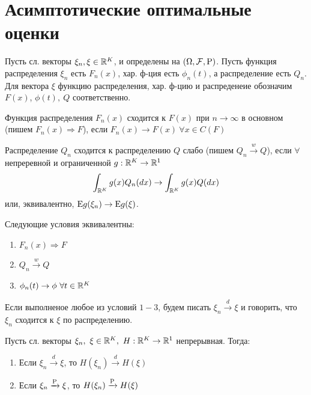 \section{Асимптотические оптимальные оценки}
    Пусть сл. векторы \(\xi_n, \xi \in \R^K\), и определены на \((\Omega, \mathcal{F}, \P)\).
Пусть функция распределения \(\xi_n\) есть \(F_n(x)\), хар. ф-ция есть \(\phi_n(t)\), а распределение
есть \(Q_n\). Для вектора \(\xi\) функцию распределения, хар. ф-цию и распреденеие обозначим \(F(x)\),
\(\phi(t),\ Q\) соответственно.

\begin{definition}
    Функция распределения \(F_n(x)\) сходится к \(F(x)\) при \(n \rightarrow \infty\) в основном
    (пишем \(F_n(x) \Rightarrow F\)), если \(F_n(x) \rightarrow F(x) \ \forall x \in C(F)\)
\end{definition}

\begin{definition}
    Распределение \(Q_n\) сходится к распределению \(Q\) слабо (пишем \(Q_n \xrightarrow{w} Q\)),
    если \(\forall\) непреревной и ограниченной \(g: \R^K \rightarrow \R^1\)
    \[ \int_{\R^K} g(x)Q_n(dx) \rightarrow \int_{\R^K} g(x)Q(dx)\]
    или, эквивалентно, \(\E g(\xi_n) \rightarrow \E g(\xi)\).
\end{definition}

\begin{theorem}
    Следующие условия эквивалентны:
    \begin{enumerate}
        \item \(F_n(x) \Rightarrow F\)
        \item \(Q_n \xrightarrow{w} Q\)
        \item \(\phi_n(t) \rightarrow \phi \ \forall t \in \R^K\)
    \end{enumerate}
    Если выполненое любое из условий \(1 - 3\), будем писать
    \(\xi_n \xrightarrow{d} \xi\) и говорить, что \(\xi_n\) сходится к \(\xi\) по распределению.
\end{theorem}

\begin{theorem} \label{th::inherit_conv}
    Пусть сл. векторы \(\xi_n,\ \xi\in\R^K,\ H:\R^K\rightarrow\R^1\) непрерывная.
    Тогда:
    \begin{enumerate}
        \item Если \(\xi_n \xrightarrow{d} \xi\), то \(H(\xi_n) \xrightarrow{d} H(\xi)\)
        \item Если \(\xi_n \xrightarrow{\P} \xi\), то \(H(\xi_n) \xrightarrow{\P} H(\xi)\)
    \end{enumerate}
\end{theorem}

